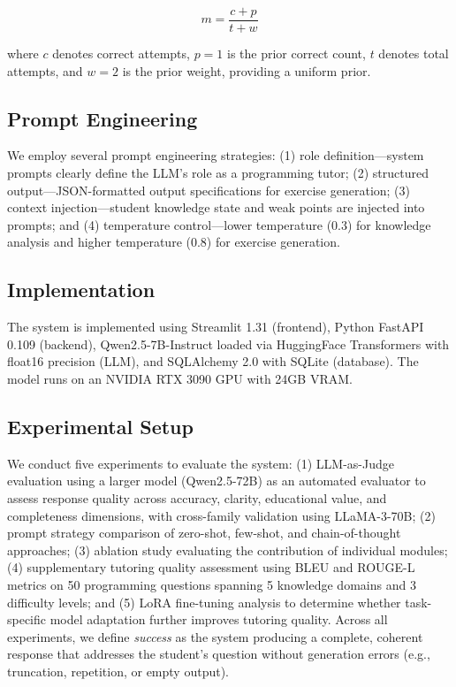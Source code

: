\documentclass[journal,article,submit,pdftex,moreauthors]{Definitions/mdpi}
\begin{document}
\begin{linenomath}
\begin{equation}
m = \frac{c + p}{t + w}
\end{equation}
\end{linenomath}

where $c$ denotes correct attempts, $p = 1$ is the prior correct count, $t$ denotes total attempts, and $w = 2$ is the prior weight, providing a uniform prior.

\subsection{Prompt Engineering}

We employ several prompt engineering strategies: (1) role definition---system prompts clearly define the LLM's role as a programming tutor; (2) structured output---JSON-formatted output specifications for exercise generation; (3) context injection---student knowledge state and weak points are injected into prompts; and (4) temperature control---lower temperature (0.3) for knowledge analysis and higher temperature (0.8) for exercise generation.

\subsection{Implementation}

The system is implemented using Streamlit 1.31 (frontend), Python FastAPI 0.109 (backend), Qwen2.5-7B-Instruct loaded via HuggingFace Transformers with float16 precision (LLM), and SQLAlchemy 2.0 with SQLite (database). The model runs on an NVIDIA RTX 3090 GPU with 24GB VRAM.

\subsection{Experimental Setup}

We conduct five experiments to evaluate the system: (1) LLM-as-Judge evaluation using a larger model (Qwen2.5-72B) as an automated evaluator to assess response quality across accuracy, clarity, educational value, and completeness dimensions, with cross-family validation using LLaMA-3-70B; (2) prompt strategy comparison of zero-shot, few-shot, and chain-of-thought approaches; (3) ablation study evaluating the contribution of individual modules; (4) supplementary tutoring quality assessment using BLEU and ROUGE-L metrics on 50 programming questions spanning 5 knowledge domains and 3 difficulty levels; and (5) LoRA fine-tuning analysis to determine whether task-specific model adaptation further improves tutoring quality. Across all experiments, we define \textit{success} as the system producing a complete, coherent response that addresses the student's question without generation errors (e.g., truncation, repetition, or empty output).
\end{document}
